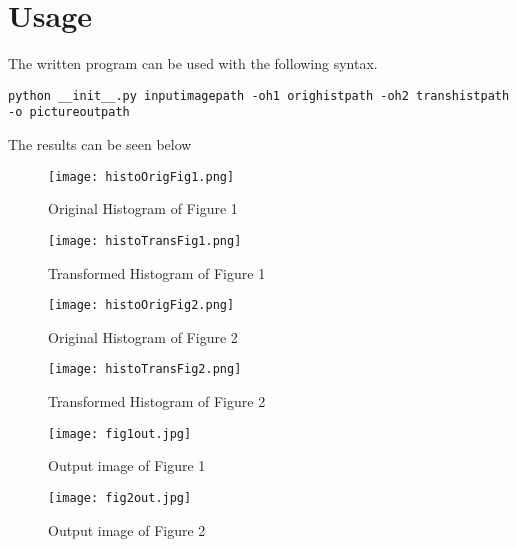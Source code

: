 \section{Usage}

The written program can be used with the following syntax.

\begin{lstlisting}
python __init__.py inputimagepath -oh1 orighistpath -oh2 transhistpath -o pictureoutpath
\end{lstlisting}

The results can be seen below

\begin{figure}[htbp]
\centering
\texttt{[image: histoOrigFig1.png]}
\caption{Original Histogram of Figure 1}
\label{fig:abc}
\end{figure}
\begin{figure}[htbp]
\centering
\texttt{[image: histoTransFig1.png]}
\caption{Transformed Histogram of Figure 1}
\label{fig:abc}
\end{figure}
\begin{figure}[htbp]
\centering
\texttt{[image: histoOrigFig2.png]}
\caption{Original Histogram of Figure 2}
\label{fig:abc}
\end{figure}
\begin{figure}[htbp]
\centering
\texttt{[image: histoTransFig2.png]}
\caption{Transformed Histogram of Figure 2}
\label{fig:abc}
\end{figure}
\begin{figure}[htbp]
\centering
\texttt{[image: fig1out.jpg]}
\caption{Output image of Figure 1}
\label{fig:abc}
\end{figure}
\begin{figure}[htbp]
\centering
\texttt{[image: fig2out.jpg]}
\caption{Output image of Figure 2}
\label{fig:abc}
\end{figure}
